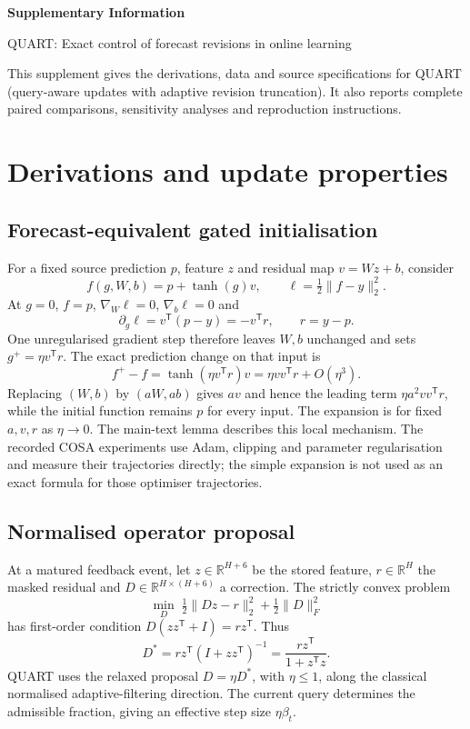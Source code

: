 \documentclass[11pt,a4paper]{article}
\newcommand{\R}{\mathbb R}
\begin{document}
\begin{center}
{\LARGE\bfseries Supplementary Information}\par\vspace{4mm}
{\Large QUART: Exact control of forecast revisions in online learning}\par\vspace{4mm}
\end{center}
\vspace{3mm}
This supplement gives the derivations, data and source specifications for QUART (query-aware updates with adaptive revision truncation). It also reports complete paired comparisons, sensitivity analyses and reproduction instructions.
{\small\tableofcontents}
\clearpage

\section{Derivations and update properties}
\subsection{Forecast-equivalent gated initialisation}
For a fixed source prediction $p$, feature $z$ and residual map $v=Wz+b$, consider
\[
f(g,W,b)=p+\tanh(g)v,\qquad \ell=\tfrac12\|f-y\|_2^2.
\]
At $g=0$, $f=p$, $\nabla_W\ell=0$, $\nabla_b\ell=0$ and
\[
\partial_g\ell=v^{\mathsf T}(p-y)=-v^{\mathsf T}r,\qquad r=y-p.
\]
One unregularised gradient step therefore leaves $W,b$ unchanged and sets $g^+=\eta v^{\mathsf T}r$. The exact prediction change on that input is
\[
f^+-f=\tanh(\eta v^{\mathsf T}r)v
       =\eta vv^{\mathsf T}r+O(\eta^3).
\]
Replacing $(W,b)$ by $(aW,ab)$ gives $av$ and hence the leading term $\eta a^2vv^{\mathsf T}r$, while the initial function remains $p$ for every input. The expansion is for fixed $a,v,r$ as $\eta\rightarrow0$. The main-text lemma describes this local mechanism. The recorded COSA experiments use Adam, clipping and parameter regularisation and measure their trajectories directly; the simple expansion is not used as an exact formula for those optimiser trajectories.

\subsection{Normalised operator proposal}
At a matured feedback event, let $z\in\R^{H+6}$ be the stored feature, $r\in\R^H$ the masked residual and $D\in\R^{H\times(H+6)}$ a correction. The strictly convex problem
\[
\min_D\;\tfrac12\|Dz-r\|_2^2+\tfrac12\|D\|_F^2
\]
has first-order condition $D(zz^{\mathsf T}+I)=rz^{\mathsf T}$. Thus
\[
D^*=rz^{\mathsf T}(I+zz^{\mathsf T})^{-1}
   =\frac{rz^{\mathsf T}}{1+z^{\mathsf T}z}.
\]
QUART uses the relaxed proposal $D=\eta D^*$, with $\eta\leq1$, along the classical normalised adaptive-filtering direction. The current query determines the admissible fraction, giving an effective step size $\eta\beta_t$.
\end{document}
